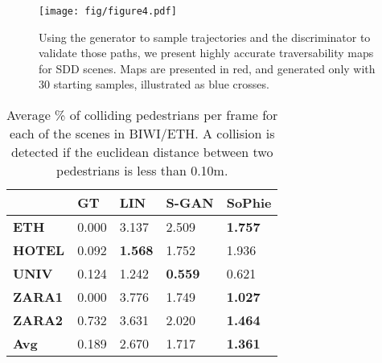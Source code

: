 \documentclass[10pt,twocolumn,letterpaper]{article}
\begin{document}
\begin{figure*}[ht!]
  \centering
    \texttt{[image: fig/figure4.pdf]}  
\caption{\small Using the generator to sample trajectories and the discriminator to validate those paths, we present highly accurate traversability maps for SDD scenes. Maps are presented in red, and generated only with 30 starting samples, illustrated as blue crosses.} 
	\label{fig:qual2}
\end{figure*}


\begin{table}[ht!]
\centering
\begin{tabular}{l|l|l|l|l} 
               & \textbf{GT} & \textbf{LIN}   & \textbf{S-GAN} & \textbf{SoPhie} \\ \hline
\textbf{ETH}   & 0.000       & 3.137          & 2.509          & \textbf{1.757}  \\
\textbf{HOTEL} & 0.092       & \textbf{1.568} & 1.752          & 1.936           \\
\textbf{UNIV}  & 0.124       & 1.242          & \textbf{0.559} & 0.621           \\
\textbf{ZARA1} & 0.000       & 3.776          & 1.749          & \textbf{1.027}  \\
\textbf{ZARA2} & 0.732       & 3.631          & 2.020          & \textbf{1.464}  \\\hline
\textbf{Avg} & 0.189       & 2.670          & 1.717          & \textbf{1.361} \\\bottomrule
\end{tabular}
\caption{\small{Average \% of colliding pedestrians per frame for each of the scenes in BIWI/ETH. A collision is detected if the euclidean distance between two pedestrians is less than 0.10m.}}
\label{tab:collision}
\end{table}

\begin{table}[ht!]
\centering
\caption{\small{Performance of multiple baselines on the Stanford Drone Dataset, split into physically simple and complex scenes. Error is ADE and is reported in pixels.}}
\label{tab:collision}
\end{table}
\end{document}
